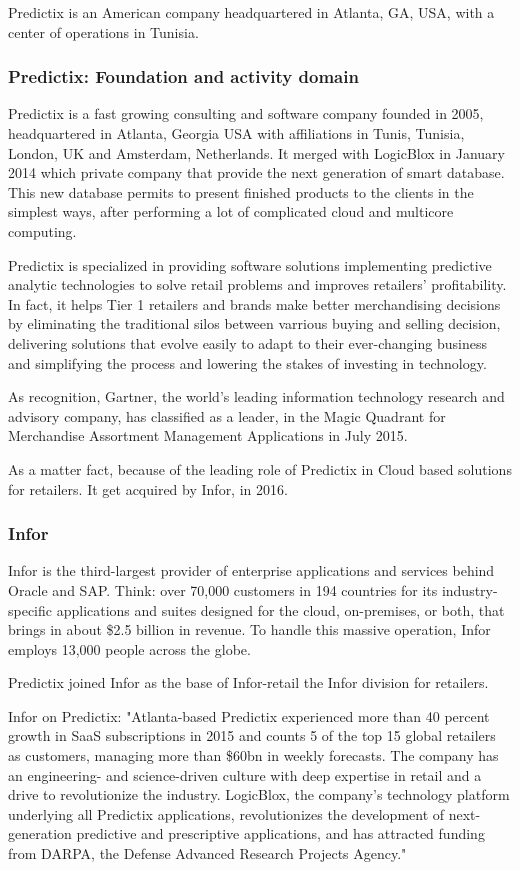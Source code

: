 Predictix is an American company headquartered in Atlanta, GA, USA, with a
center of operations in Tunisia.
\subsubsection{Predictix: Foundation and activity domain}

Predictix is a fast growing consulting and software company founded in 2005,
headquartered in Atlanta, Georgia USA with affiliations in Tunis, Tunisia,
London, UK and Amsterdam, Netherlands. It merged with LogicBlox in January 2014
which private company that provide the next generation of smart database. This
new database permits to present finished products to the clients in the simplest
ways, after performing a lot of complicated cloud and multicore computing.

Predictix is specialized in providing software solutions implementing predictive
analytic technologies to solve retail problems and improves retailers'
profitability. In fact, it helps Tier 1 retailers and brands make better
merchandising decisions  by eliminating the traditional silos between varrious
buying and selling decision, delivering solutions that evolve easily to adapt to
their ever-changing business and simplifying the process and lowering the stakes
of investing in technology.

As recognition, Gartner, the world's leading information technology research and
advisory company, has classified as a leader, in the Magic Quadrant for
Merchandise Assortment Management Applications in July 2015.

As a matter fact, because of the leading role of Predictix in Cloud based
solutions for retailers. It get acquired by Infor, in 2016.

\subsubsection{Infor}
Infor is the third-largest provider of enterprise applications and services
behind Oracle and SAP. Think: over 70,000 customers in 194 countries for its
industry-specific applications and suites designed for the cloud, on-premises,
or both, that brings in about \$2.5 billion in revenue. To handle this massive
operation, Infor employs 13,000 people across the globe.

Predictix joined Infor as the base of Infor-retail the Infor division for
retailers.

Infor on Predictix:
"Atlanta-based Predictix experienced more than 40 percent growth in SaaS
subscriptions in 2015 and counts 5 of the top 15 global retailers as customers,
managing more than \$60bn in weekly forecasts. The company has an engineering-
and science-driven culture with deep expertise in retail and a drive to
revolutionize the industry. LogicBlox, the company's technology platform
underlying all Predictix applications, revolutionizes the development of
next-generation predictive and prescriptive applications, and has attracted
funding from DARPA, the Defense Advanced Research Projects Agency."

